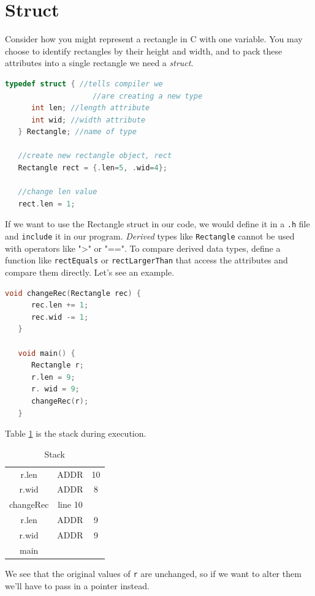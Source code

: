 \documentclass[nobib]{tufte-handout}
\begin{document}
\pagebreak 

\section{Struct}
Consider how you might represent a rectangle 
in C with one variable. You may choose to identify rectangles by their height and 
width, and to pack these attributes into a single rectangle we need a \emph{struct}. 
\begin{lstlisting}[language=C,caption=Struct]
   typedef struct { //tells compiler we 
                    //are creating a new type
      int len; //length attribute
      int wid; //width attribute
   } Rectangle; //name of type

   //create new rectangle object, rect
   Rectangle rect = {.len=5, .wid=4};

   //change len value
   rect.len = 1;
\end{lstlisting}
If we want to use the Rectangle struct in our code, we would define it 
in a \texttt{.h} file and \texttt{include} it in our program. \emph{Derived} 
types like \texttt{Rectangle} cannot be used with operators like ">" or 
"==". To compare derived data types, define a function like \texttt{rectEquals}
or \texttt{rectLargerThan} that access the attributes and compare them 
directly. Let's see an example.
\begin{lstlisting}[language=C,caption=changeRec]
   void changeRec(Rectangle rec) {
      rec.len += 1;
      rec.wid -= 1;
   }

   void main() {
      Rectangle r;
      r.len = 9;
      r. wid = 9;
      changeRec(r);
   }
\end{lstlisting}
Table \ref{table:structstack} is the stack during execution. 
\begin{table}[h]
   \centering
   \caption{Stack}
   \label{table:structstack}
   \begin{tabular}{|c c c|}
   \hline
   r.len & ADDR & 10 \\
   r.wid & ADDR & 8 \\
   changeRec & line 10 &\\
   \hline
   r.len & ADDR & 9 \\
   r.wid & ADDR & 9 \\
   main & & \\
   \hline
   \end{tabular}
\end{table}
We see that the original values of \texttt{r} are unchanged, 
so if we want to alter them we'll have to pass in a pointer instead. 
\end{document}
